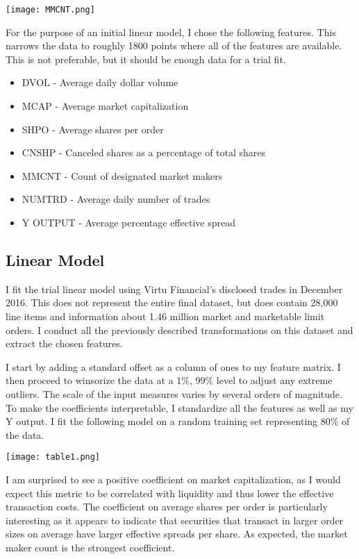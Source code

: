 \documentclass{article}
\begin{document}
\begin{multicols}{2}
\begingroup
    \centering
    \texttt{[image: MMCNT.png]}
\endgroup
\vspace{3mm}
\par

\noindent For the purpose of an initial linear model, I chose the following features. This narrows the data to roughly 1800 points where all of the features are available. This is not preferable, but it should be enough data for a trial fit.

\begin{itemize}
 \item DVOL - Average daily dollar volume
\item MCAP - Average market capitalization 
\item SHPO - Average shares per order
\item CNSHP - Canceled shares as a percentage of total shares
\item MMCNT - Count of designated market makers
\item NUMTRD - Average daily number of trades
\item Y OUTPUT - Average percentage effective spread
\end{itemize}


\subsection{Linear Model}
\par
I fit the trial linear model using Virtu Financial's disclosed trades in December 2016. This does not represent the entire final dataset, but does contain 28,000 line items and information about 1.46 million market and marketable limit orders. I conduct all the previously described transformations on this dataset and extract the chosen features.
\par
\par 
I start by adding a standard offset as a column of ones to my feature matrix. I then proceed to winsorize the data at a 1\%, 99\% level to adjust any extreme outliers. The scale of the input measures varies by several orders of magnitude. To make the coefficients interpretable, I standardize all the features as well as my Y output. I fit the following model on a random training set representing 80\% of the data.


    \texttt{[image: table1.png]}
\par
I am surprised to see a positive coefficient on market capitalization, as I would expect this metric to be correlated with liquidity and thus lower the effective transaction costs. The coefficient on average shares per order is particularly interesting as it appears to indicate that securities that transact in larger order sizes on average have larger effective spreads per share. As expected, the market maker count is the strongest coefficient.




\end{multicols}
\end{document}
